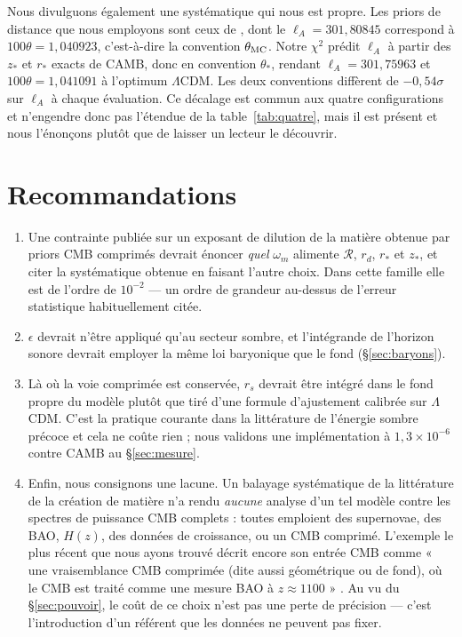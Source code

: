 \documentclass[11pt,a4paper]{article}
\begin{document}
Nous divulguons également une systématique qui nous est propre. Les priors de distance que
nous employons sont ceux de \citet{zhaiwang2019}, dont le $\ell_A=301{,}80845$ correspond à
$100\theta=1{,}040923$, c'est-à-dire la convention $\theta_{\rm MC}$. Notre $\chi^2$ prédit
$\ell_A$ à partir des $z_\ast$ et $r_\ast$ exacts de CAMB, donc en convention $\theta_\ast$,
rendant $\ell_A=301{,}75963$ et $100\theta=1{,}041091$ à l'optimum $\Lambda$CDM. Les deux
conventions diffèrent de $-0{,}54\sigma$ sur $\ell_A$ à chaque évaluation. Ce décalage est
commun aux quatre configurations et n'engendre donc pas l'étendue de la
table~\ref{tab:quatre}, mais il est présent et nous l'énonçons plutôt que de laisser un
lecteur le découvrir.

\section{Recommandations}
\label{sec:reco}

\begin{enumerate}
\item Une contrainte publiée sur un exposant de dilution de la matière obtenue par priors CMB
      comprimés devrait énoncer \emph{quel} $\omega_m$ alimente $\mathcal{R}$, $r_d$,
      $r_\ast$ et $z_\ast$, et citer la systématique obtenue en faisant l'autre choix. Dans
      cette famille elle est de l'ordre de $10^{-2}$ --- un ordre de grandeur au-dessus de
      l'erreur statistique habituellement citée.
\item $\epsilon$ devrait n'être appliqué qu'au secteur sombre, et l'intégrande de l'horizon
      sonore devrait employer la même loi baryonique que le fond (\S\ref{sec:baryons}).
\item Là où la voie comprimée est conservée, $r_s$ devrait être intégré dans le fond propre du
      modèle plutôt que tiré d'une formule d'ajustement calibrée sur $\Lambda$CDM. C'est la
      pratique courante dans la littérature de l'énergie sombre précoce et cela ne coûte
      rien ; nous validons une implémentation à $1{,}3\times10^{-6}$ contre CAMB au
      \S\ref{sec:mesure}.
\item Enfin, nous consignons une lacune. Un balayage systématique de la littérature de la
      création de matière n'a rendu \emph{aucune} analyse d'un tel modèle contre les spectres
      de puissance CMB complets : toutes emploient des supernovae, des BAO, $H(z)$, des
      données de croissance, ou un CMB comprimé. L'exemple le plus récent que nous ayons
      trouvé décrit encore son entrée CMB comme « une vraisemblance CMB comprimée (dite aussi
      géométrique ou de fond), où le CMB est traité comme une mesure BAO à $z\approx1100$ »
      \citep{schiavone2026}. Au vu du \S\ref{sec:pouvoir}, le coût de ce choix n'est pas une
      perte de précision --- c'est l'introduction d'un référent que les données ne peuvent pas
      fixer.
\end{enumerate}
\end{document}
